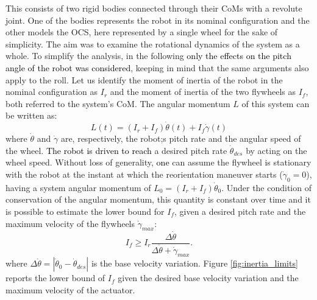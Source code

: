 \documentclass[sensors,article,accept,pdftex,moreauthors]{Definitions/mdpi}
\newcommand{\MF}[1]{\textcolor{black}{#1}}
\begin{document}
This consists of two rigid bodies connected through their CoMs with a revolute joint. One of the bodies represents the robot in its nominal configuration and the other models the OCS, here represented by a single wheel for the sake of simplicity. The aim was to examine the rotational dynamics of the system as a whole. To simplify the analysis, in the following \MF{only the effects on the pitch angle of the robot was considered}, keeping in mind that the same arguments also apply to the roll. 
Let us identify the moment of inertia of the robot in the nominal configuration as $I_r$ and the moment of inertia of the two flywheels as $I_f$, both referred to the system's CoM.
The angular momentum $L$ of this system can be written as:
\begin{equation}\label{eq:ang_mom_elroy}
L(t) = \left(I_r + I_{f}\right)\dot{\theta}(t) + I_{f}\dot{\gamma}(t)
\end{equation}
where $\dot{\theta}$ and $\dot{\gamma}$ are, respectively, the robot;s pitch rate and the angular speed of the wheel.
\MF{The robot is driven to reach} a desired pitch rate $\dot{\theta}_{des}$ by acting on the wheel speed.
Without loss of generality, \MF{one} can assume the flywheel is stationary with the robot at the instant at which the reorientation maneuver starts ($\dot{\gamma}_0 = 0$), having a system angular momentum of $L_0 = \left(I_r + I_{f}\right)\dot{\theta}_0$.
Under the condition of conservation of the angular momentum, this quantity is constant over time and it is possible to estimate the lower bound for $I_{f}$, given a desired pitch rate and the maximum velocity of the flywheels $\dot{\gamma}_{max}$:
\begin{equation}
I_{f} \geq I_r \dfrac{ \Delta \dot{\theta} }{\Delta \dot{\theta}+\dot{\gamma}_{max}}.
\end{equation}
where $\Delta \dot{\theta} =  \left\lvert \dot{\theta}_0-\dot{\theta}_{des} \right\rvert$ is the base velocity variation.
Figure \ref{fig:inertia_limits} reports the lower bound of $I_{f}$ given the desired base velocity variation and the maximum velocity of the actuator.

\vspace{-9pt}
\end{document}
